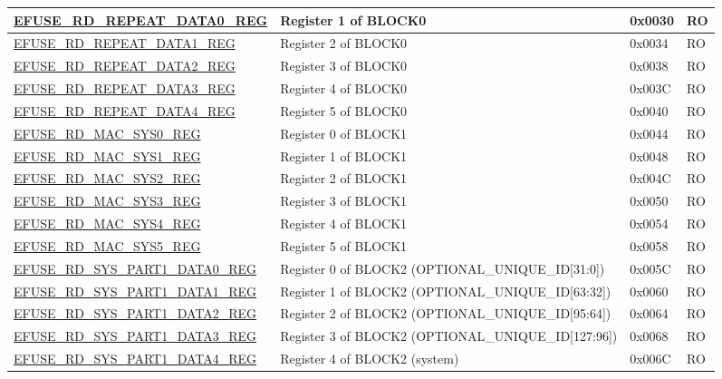 \begin{longtable}{ | p{6.8cm} | p{7cm} | p{1.3cm} | p{1.2cm} | }
    \hyperref[regdesc:EFUSERDREPEATDATA0REG]{EFUSE\_RD\_REPEAT\_DATA0\_REG} & Register 1 of BLOCK0 & 0x0030 & RO \\ \hline
    \hyperref[regdesc:EFUSERDREPEATDATA1REG]{EFUSE\_RD\_REPEAT\_DATA1\_REG} & Register 2 of BLOCK0 & 0x0034 & RO \\ \hline
    \hyperref[regdesc:EFUSERDREPEATDATA2REG]{EFUSE\_RD\_REPEAT\_DATA2\_REG} & Register 3 of BLOCK0 & 0x0038 & RO \\ \hline
    \hyperref[regdesc:EFUSERDREPEATDATA3REG]{EFUSE\_RD\_REPEAT\_DATA3\_REG} & Register 4 of BLOCK0 & 0x003C & RO \\ \hline
    \hyperref[regdesc:EFUSERDREPEATDATA4REG]{EFUSE\_RD\_REPEAT\_DATA4\_REG} & Register 5 of BLOCK0 & 0x0040 & RO \\ \hline
    \hyperref[regdesc:EFUSERDMACSYS0REG]{EFUSE\_RD\_MAC\_SYS0\_REG} & Register 0 of BLOCK1 & 0x0044 & RO \\ \hline
    \hyperref[regdesc:EFUSERDMACSYS1REG]{EFUSE\_RD\_MAC\_SYS1\_REG} & Register 1 of BLOCK1 & 0x0048 & RO \\ \hline
    \hyperref[regdesc:EFUSERDMACSYS2REG]{EFUSE\_RD\_MAC\_SYS2\_REG} & Register 2 of BLOCK1 & 0x004C & RO \\ \hline
    \hyperref[regdesc:EFUSERDMACSYS3REG]{EFUSE\_RD\_MAC\_SYS3\_REG} & Register 3 of BLOCK1 & 0x0050 & RO \\ \hline
    \hyperref[regdesc:EFUSERDMACSYS4REG]{EFUSE\_RD\_MAC\_SYS4\_REG} & Register 4 of BLOCK1 & 0x0054 & RO \\ \hline
    \hyperref[regdesc:EFUSERDMACSYS5REG]{EFUSE\_RD\_MAC\_SYS5\_REG} & Register 5 of BLOCK1 & 0x0058 & RO \\ \hline
    \hyperref[regdesc:EFUSERDSYSPART1DATA0REG]{EFUSE\_RD\_SYS\_PART1\_DATA0\_REG} & Register 0 of BLOCK2 (OPTIONAL\_UNIQUE\_ID[31:0]) & 0x005C & RO \\ \hline
    \hyperref[regdesc:EFUSERDSYSPART1DATA1REG]{EFUSE\_RD\_SYS\_PART1\_DATA1\_REG} & Register 1 of BLOCK2 (OPTIONAL\_UNIQUE\_ID[63:32]) & 0x0060 & RO \\ \hline
    \hyperref[regdesc:EFUSERDSYSPART1DATA2REG]{EFUSE\_RD\_SYS\_PART1\_DATA2\_REG} & Register 2 of BLOCK2 (OPTIONAL\_UNIQUE\_ID[95:64]) & 0x0064 & RO \\ \hline
    \hyperref[regdesc:EFUSERDSYSPART1DATA3REG]{EFUSE\_RD\_SYS\_PART1\_DATA3\_REG} & Register 3 of BLOCK2 (OPTIONAL\_UNIQUE\_ID[127:96]) & 0x0068 & RO \\ \hline
    \hyperref[regdesc:EFUSERDSYSPART1DATA4TO7REG]{EFUSE\_RD\_SYS\_PART1\_DATA4\_REG} & Register 4 of BLOCK2 (system) & 0x006C & RO \\ \hline

\end{longtable}
